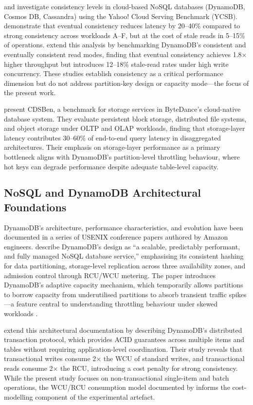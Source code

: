 \citet{ferreira2024consistency} and \citet{ferreira2025ycsb} investigate consistency levels in cloud-based NoSQL databases (DynamoDB, Cosmos DB, Cassandra) using the Yahoo! Cloud Serving Benchmark (YCSB). \citet{ferreira2024consistency} demonstrate that eventual consistency reduces latency by 20–40\% compared to strong consistency across workloads A–F, but at the cost of stale reads in 5–15\% of operations. \citet{ferreira2025ycsb} extend this analysis by benchmarking DynamoDB's consistent and eventually consistent read modes, finding that eventual consistency achieves 1.8× higher throughput but introduces 12–18\% stale-read rates under high write concurrency. These studies establish consistency as a critical performance dimension but do not address partition-key design or capacity mode—the focus of the present work.

\citet{zhang2023cdsben} present CDSBen, a benchmark for storage services in ByteDance's cloud-native database system. They evaluate persistent block storage, distributed file systems, and object storage under OLTP and OLAP workloads, finding that storage-layer latency contributes 30–60\% of end-to-end query latency in disaggregated architectures. Their emphasis on storage-layer performance as a primary bottleneck aligns with DynamoDB's partition-level throttling behaviour, where hot keys can degrade performance despite adequate table-level capacity.

\subsection{NoSQL and DynamoDB Architectural Foundations}

DynamoDB's architecture, performance characteristics, and evolution have been documented in a series of USENIX conference papers authored by Amazon engineers. \citet{elhemali2022dynamodb} describe DynamoDB's design as ``a scalable, predictably performant, and fully managed NoSQL database service,'' emphasising its consistent hashing for data partitioning, storage-level replication across three availability zones, and admission control through RCU/WCU metering. The paper introduces DynamoDB's adaptive capacity mechanism, which temporarily allows partitions to borrow capacity from underutilised partitions to absorb transient traffic spikes—a feature central to understanding throttling behaviour under skewed workloads \citep{aws2025adaptive}.

\citet{idziorek2023transactions} extend this architectural documentation by describing DynamoDB's distributed transaction protocol, which provides ACID guarantees across multiple items and tables without requiring application-level coordination. Their study reveals that transactional writes consume 2× the WCU of standard writes, and transactional reads consume 2× the RCU, introducing a cost penalty for strong consistency. While the present study focuses on non-transactional single-item and batch operations, the WCU/RCU consumption model documented by \citet{idziorek2023transactions} informs the cost-modelling component of the experimental artefact.


